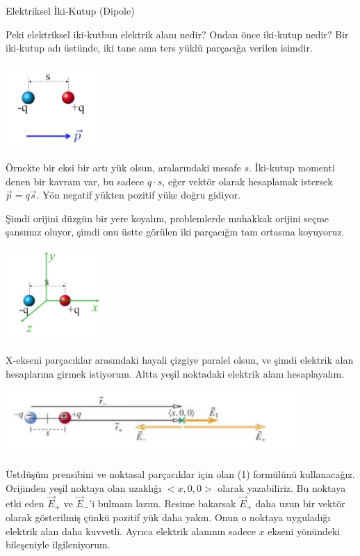 \documentclass[12pt,fleqn]{article}\usepackage{../../common}
\begin{document}
Elektriksel İki-Kutup (Dipole)

Peki elektriksel iki-kutbun elektrik alanı nedir? Ondan önce iki-kutup nedir?
Bir iki-kutup adı üstünde, iki tane ama ters yüklü parçacığa verilen isimdir.

\includegraphics[width=10em]{02_08.png}

Örnekte bir eksi bir artı yük olsun, aralarındaki mesafe $s$. İki-kutup momenti
denen bir kavram var, bu sadece $q \cdot s$, eğer vektör olarak hesaplamak
istersek $\vec{p} = q \vec{s}$. Yön negatif yükten pozitif yüke doğru gidiyor.

Şimdi orijini düzgün bir yere koyalım, problemlerde muhakkak orijini seçme
şansımız oluyor, şimdi onu üstte görülen iki parçacığın tam ortasına koyuyoruz.

\includegraphics[width=10em]{02_09.png}

X-ekseni parçacıklar arasındaki hayali çizgiye paralel olsun, ve şimdi elektrik
alan hesaplarına girmek istiyorum. Altta yeşil noktadaki elektrik alanı
hesaplayalım.

\includegraphics[width=30em]{02_10.png}

Üstdüşüm prensibini ve noktasal parçacıklar için olan (1) formülünü
kullanacağız. Orijinden yeşil noktaya olan uzaklığı $< x,0,0 >$ olarak
yazabiliriz. Bu noktaya etki eden $\vec{E}_{+}$ ve $\vec{E}_{-}$'i bulmam
lazım. Resime bakarsak $\vec{E}_{+}$ daha uzun bir vektör olarak gösterilmiş
çünkü pozitif yük daha yakın. Onun o noktaya uyguladığı elektrik alan daha
kuvvetli. Ayrıca elektrik alanının sadece $x$ ekseni yönündeki bileşeniyle
ilgileniyorum.
\end{document}
